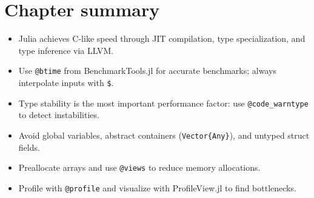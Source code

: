 \section{Chapter summary}

\begin{itemize}
  \item Julia achieves C-like speed through JIT compilation, type specialization, and type inference via LLVM.
  \item Use \texttt{@btime} from BenchmarkTools.jl for accurate benchmarks; always interpolate inputs with \texttt{\$}.
  \item Type stability is the most important performance factor: use \texttt{@code\_warntype} to detect instabilities.
  \item Avoid global variables, abstract containers (\texttt{Vector\{Any\}}), and untyped struct fields.
  \item Preallocate arrays and use \texttt{@views} to reduce memory allocations.
  \item Profile with \texttt{@profile} and visualize with ProfileView.jl to find bottlenecks.
\end{itemize}
